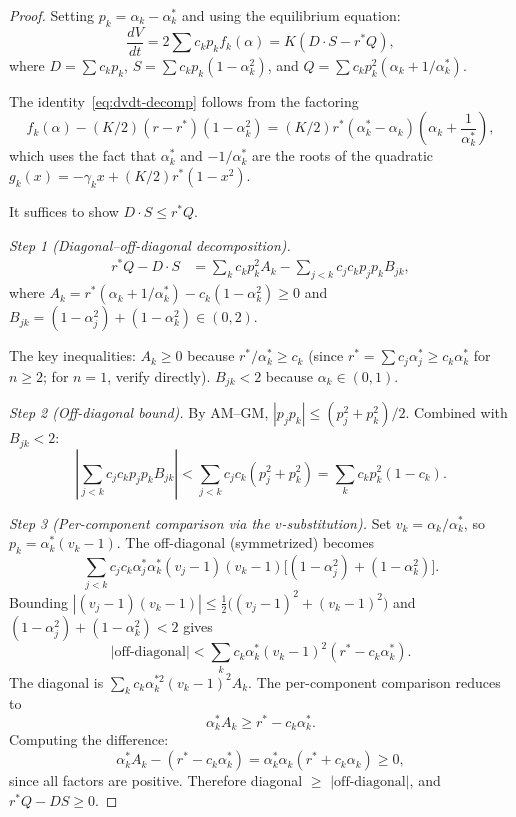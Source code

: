 \documentclass[11pt,a4paper]{article}
\theoremstyle{definition}
\begin{document}
\begin{proof}
Setting $p_k = \alpha_k - \alpha^*_k$ and using the equilibrium equation:
\begin{equation}\label{eq:dvdt-decomp}
\frac{dV}{dt} = 2\sum c_k p_k f_k(\alpha) = K(D \cdot S - r^* Q),
\end{equation}
where $D = \sum c_k p_k$, $S = \sum c_k p_k(1-\alpha_k^2)$, and $Q = \sum c_k p_k^2(\alpha_k + 1/\alpha^*_k)$.

The identity~\eqref{eq:dvdt-decomp} follows from the factoring
\begin{equation}\label{eq:velocity-factor}
f_k(\alpha) - (K/2)(r-r^*)(1-\alpha_k^2) = (K/2)r^*(\alpha^*_k - \alpha_k)\!\left(\alpha_k + \frac{1}{\alpha^*_k}\right),
\end{equation}
which uses the fact that $\alpha^*_k$ and $-1/\alpha^*_k$ are the roots of the quadratic $g_k(x) = -\gamma_k x + (K/2)r^*(1-x^2)$.

It suffices to show $D \cdot S \leq r^* Q$.

\emph{Step 1 (Diagonal--off-diagonal decomposition).}
\begin{align*}
r^*Q - D \cdot S &= \sum_k c_k p_k^2 A_k - \sum_{j < k} c_j c_k p_j p_k B_{jk},
\end{align*}
where $A_k = r^*(\alpha_k + 1/\alpha^*_k) - c_k(1-\alpha_k^2) \geq 0$ and $B_{jk} = (1-\alpha_j^2) + (1-\alpha_k^2) \in (0,2)$.

The key inequalities: $A_k \geq 0$ because $r^*/\alpha^*_k \geq c_k$ (since $r^* = \sum c_j\alpha^*_j \geq c_k\alpha^*_k$ for $n \geq 2$; for $n=1$, verify directly). $B_{jk} < 2$ because $\alpha_k \in (0,1)$.

\emph{Step 2 (Off-diagonal bound).} By AM--GM, $|p_j p_k| \leq (p_j^2 + p_k^2)/2$. Combined with $B_{jk} < 2$:
\[
\left|\sum_{j<k} c_j c_k p_j p_k B_{jk}\right| < \sum_{j<k} c_j c_k (p_j^2 + p_k^2) = \sum_k c_k p_k^2 (1-c_k).
\]

\emph{Step 3 (Per-component comparison via the $v$-substitution).} Set $v_k = \alpha_k/\alpha^*_k$, so $p_k = \alpha^*_k(v_k - 1)$. The off-diagonal (symmetrized) becomes
\[
\sum_{j<k} c_j c_k \alpha^*_j \alpha^*_k (v_j - 1)(v_k - 1)\bigl[(1-\alpha_j^2)+(1-\alpha_k^2)\bigr].
\]
Bounding $|(v_j-1)(v_k-1)| \leq \tfrac{1}{2}\bigl((v_j-1)^2 + (v_k-1)^2\bigr)$ and $(1-\alpha_j^2)+(1-\alpha_k^2) < 2$ gives
\[
|\text{off-diagonal}| < \sum_k c_k \alpha^*_k (v_k-1)^2 (r^* - c_k\alpha^*_k).
\]
The diagonal is $\sum_k c_k \alpha^{*2}_k (v_k-1)^2 A_k$. The per-component comparison reduces to
\[
\alpha^*_k A_k \geq r^* - c_k\alpha^*_k.
\]
Computing the difference:
\begin{equation}\label{eq:key-identity}
\alpha^*_k A_k - (r^* - c_k\alpha^*_k) = \alpha^*_k \alpha_k (r^* + c_k\alpha_k) \geq 0,
\end{equation}
since all factors are positive. Therefore diagonal $\geq$ $|\text{off-diagonal}|$, and $r^*Q - DS \geq 0$.
\end{proof}
\end{document}
